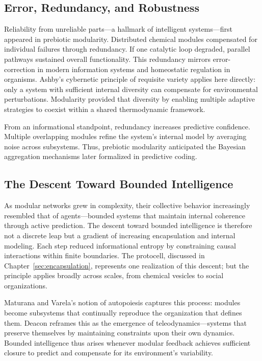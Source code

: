 \documentclass[11pt,a4paper]{article}
\begin{document}
\subsection{Error, Redundancy, and Robustness}

Reliability from unreliable parts—a hallmark of intelligent systems—first appeared in prebiotic modularity.  Distributed chemical modules compensated for individual failures through redundancy.  If one catalytic loop degraded, parallel pathways sustained overall functionality.  This redundancy mirrors error-correction in modern information systems and homeostatic regulation in organisms.  Ashby’s cybernetic principle of requisite variety \citep{Ashby1956DesignBrain} applies here directly: only a system with sufficient internal diversity can compensate for environmental perturbations.  Modularity provided that diversity by enabling multiple adaptive strategies to coexist within a shared thermodynamic framework.

From an informational standpoint, redundancy increases predictive confidence.  Multiple overlapping modules refine the system’s internal model by averaging noise across subsystems.  Thus, prebiotic modularity anticipated the Bayesian aggregation mechanisms later formalized in predictive coding.

\subsection{The Descent Toward Bounded Intelligence}

As modular networks grew in complexity, their collective behavior increasingly resembled that of agents—bounded systems that maintain internal coherence through active prediction.  The descent toward bounded intelligence is therefore not a discrete leap but a gradient of increasing encapsulation and internal modeling.  Each step reduced informational entropy by constraining causal interactions within finite boundaries.  The protocell, discussed in Chapter~\ref{sec:encapsulation}, represents one realization of this descent; but the principle applies broadly across scales, from chemical vesicles to social organizations.

Maturana and Varela’s notion of autopoiesis \citep{MaturanaVarela1980Autopoiesis} captures this process: modules become subsystems that continually reproduce the organization that defines them.  Deacon \citep{Deacon2011IncompleteNature} reframes this as the emergence of teleodynamics—systems that preserve themselves by maintaining constraints upon their own dynamics.  Bounded intelligence thus arises whenever modular feedback achieves sufficient closure to predict and compensate for its environment’s variability.
\end{document}
